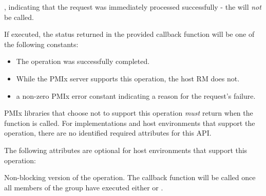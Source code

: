 \begin{arglist}
\end{arglist}

\returnsimplenb

\returnstart
\begin{constantdesc}
\item {}, indicating that the request was immediately processed successfully - the  will \textit{not} be called.
\end{constantdesc}
\returnend

If executed, the status returned in the provided callback function will be one of the following constants:

\begin{itemize}
\item {} The operation was successfully completed.
\item {} While the \ac{PMIx} server supports this operation, the host \ac{RM} does not.
\item a non-zero \ac{PMIx} error constant indicating a reason for the request's failure.
\end{itemize}

\reqattrstart
\ac{PMIx} libraries that choose not to support this operation \textit{must} return  when the function is called. For implementations and host environments that support the operation, there are no identified required
attributes for this \ac{API}.
\reqattrend

\optattrstart
The following attributes are optional for host environments that support this operation:


\optattrend

\descr

Non-blocking version of the  operation. The callback function will be called once all members of the group have executed either  or .

